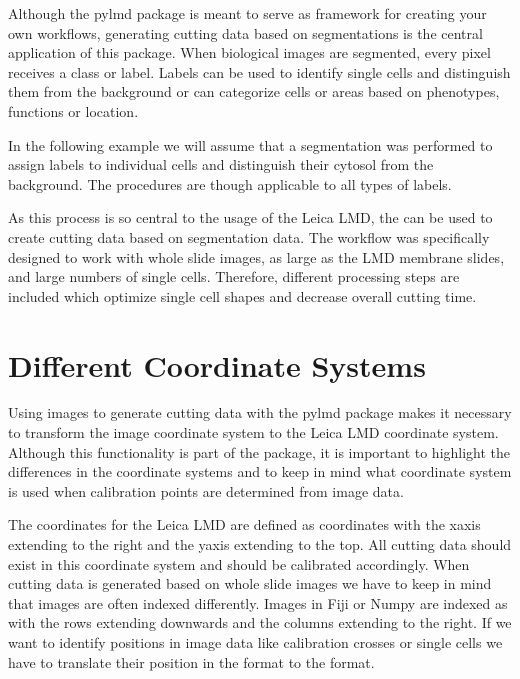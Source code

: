 \documentclass[a4paper,10pt,english,openany,oneside]{sphinxmanual}
\begin{document}
\sphinxAtStartPar
Although the py\sphinxhyphen{}lmd package is meant to serve as framework for creating your own workflows, generating cutting data based on segmentations is the central application of this package. When biological images are segmented, every pixel receives a class or label. Labels can be used to identify single cells and distinguish them from the background or can categorize cells or areas based on phenotypes, functions or location.

\sphinxAtStartPar
In the following example we will assume that a segmentation was performed to assign labels to individual cells and distinguish their cytosol from the background. The procedures are though applicable to all types of labels.

\sphinxAtStartPar
As this process is so central to the usage of the Leica LMD, the  can be used to create cutting data based on segmentation data. The workflow was specifically designed to work with whole slide images, as large as the LMD membrane slides, and large numbers of single cells. Therefore, different processing steps are included which optimize single cell shapes and decrease overall cutting time.


\section{Different Coordinate Systems}
\label{\detokenize{pages/segmentation_loader:different-coordinate-systems}}
\sphinxAtStartPar
Using images to generate cutting data with the py\sphinxhyphen{}lmd package makes it necessary to transform the image coordinate system to the Leica LMD coordinate system. Although this functionality is part of the package, it is important to highlight the differences in the coordinate systems and to keep in mind what coordinate system is used when calibration points are determined from image data.

\sphinxAtStartPar
The coordinates for the Leica LMD are defined as  coordinates with the x\sphinxhyphen{}axis extending to the right and the y\sphinxhyphen{}axis extending to the top. All cutting data should exist in this coordinate system and should be calibrated accordingly. When cutting data is generated based on whole slide images we have to keep in mind that images are often indexed differently. Images in Fiji or Numpy are indexed as  with the rows extending downwards and the columns extending to the right. If we want to identify positions in image data \sphinxhyphen{} like calibration crosses or single cells \sphinxhyphen{} we have to translate their position in the  format to the  format.
\end{document}
